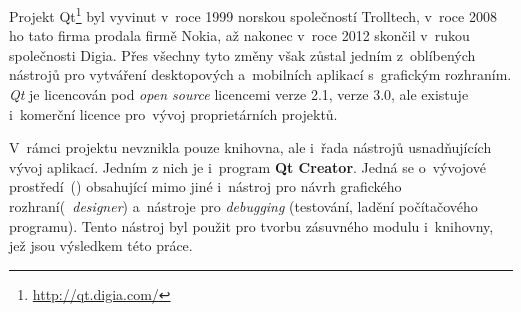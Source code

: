 Projekt Qt\footnote{\url{http://qt.digia.com/}} byl vyvinut v~roce 1999 
norskou společností Trolltech, v~roce 2008 ho tato firma prodala firmě 
Nokia, až nakonec v~roce 2012 skončil v~rukou společnosti Digia. 
Přes všechny tyto změny však zůstal jedním z~oblíbených nástrojů pro 
vytváření desktopových a~mobilních aplikací s~grafickým rozhraním. 
\textit{Qt} je licencován pod \textit{open source} licencemi  
verze 2.1,  verze 3.0, ale existuje i~komerční licence pro~vývoj
 proprietárních projektů.

V~rámci projektu nevznikla pouze knihovna, ale i~řada nástrojů usnadňujících
vývoj aplikací. Jedním z nich je i~program \textbf{Qt Creator}. Jedná se 
o~vývojové prostředí~()  obsahující mimo jiné i~nástroj pro návrh 
grafického rozhraní(\textit{~designer}) a~nástroje pro 
\textit{debugging} (testování, ladění počítačového programu).
Tento nástroj byl použit pro tvorbu zásuv\-ného modulu i~knihovny, jež jsou
výsledkem této práce.